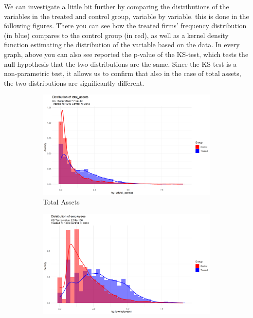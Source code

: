 \documentclass[12pt]{report}
\begin{document}
\par We can investigate a little bit further by comparing the distributions of the variables in the treated and control group, variable by variable. this is done in the following figures. There you can see how the treated firms' frequency distribution (in blue) compares to the control group (in red), as well as a kernel density function estimating the distribution of the variable based on the data. In every graph, above you can also see reported the p-value of the KS-test, which tests the null hypothesis that the two distributions are the same. Since the KS-test is a non-parametric test, it allows us to confirm that also in the case of total assets, the two distributions are significantly different.


\begin{figure}[ht]
    \centering
    \begin{subfigure}[b]{0.45\textwidth}
        \centering
        \includegraphics[width=\linewidth]{../Output/distrib_compare_total_assets_allcountries.png}
        \caption{Total Assets}
        \label{fig:total_assets}
    \end{subfigure}
    \hfill
    \begin{subfigure}[b]{0.45\textwidth}
        \centering
        \includegraphics[width=\linewidth]{../Output/distrib_compare_employees_allcountries.png}

\end{subfigure}
\end{figure}
\end{document}
